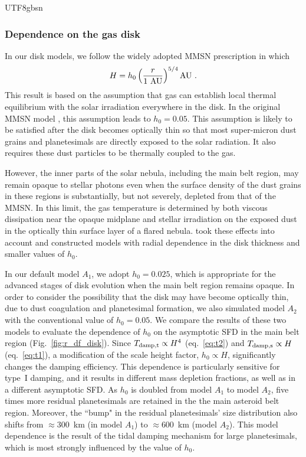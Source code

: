 \documentclass[tighten]{aastex6}
\begin{document}
\begin{CJK*}{UTF8}{gbsn}
\subsubsection{Dependence on the gas disk}
\label{sec:disk}

In our disk models, we follow the widely adopted MMSN prescription in which
\begin{equation}
H = h_0 \left(\frac{r}{1~\rm AU}\right)^{5/4}  \rm AU \ .
\end{equation}
%
This result is based on the assumption that gas can establish local 
thermal equilibrium with the solar irradiation everywhere in the disk. 
In the original MMSN model \citep{hayashi1981}, this assumption leads 
to $h_0 = 0.05$.  This assumption is likely to be satisfied after the 
disk becomes optically thin so that most super-micron dust grains and 
planetesimals are directly exposed to the solar radiation.  It also 
requires these dust particles to be thermally coupled to the gas.

However, the inner parts of the solar nebula, including the main belt 
region, may remain opaque to stellar photons even when the surface 
density of the dust grains in these regions is substantially, but 
not severely, depleted from that of the MMSN. In this limit, the gas 
temperature is determined by both viscous dissipation near the opaque 
midplane and stellar irradiation on the exposed dust in the optically 
thin surface layer of a flared nebula.  \cite{garaudlin2007} took 
these effects into account and constructed models with radial 
dependence in the disk thickness and smaller values of $h_0$. 

In our default model $A_1$, we adopt $h_0 = 0.025$, which is 
appropriate for the advanced stages of disk evolution when the main 
belt region remains opaque.  In order to consider the possibility
that the disk may have become optically thin, due to dust coagulation 
and planetesimal formation, we also simulated model $A_2$ with the 
conventional value of $h_0 = 0.05$.  We compare the results of these
two models to evaluate the dependence of $h_0$ on the asymptotic
SFD in the main belt region (Fig.~\ref{fig:r_df_disk}). Since 
$T_{\rm damp,t} \propto H^4$ (eq.~\ref{eq:t2}) and $T_{\rm damp,s} 
\propto H$ (eq.~\ref{eq:t1}), a modification of the scale height factor,
$h_0\propto H$, significantly changes the damping efficiency. 
This dependence is particularly sensitive for  type~I damping, 
and it results in different mass depletion fractions, as well as in a
different asymptotic SFD. As $h_0$ is doubled from model $A_1$ to model
$A_2$, five times more residual planetesimals are retained in the 
the main asteroid belt region. Moreover, the ``bump" in the residual
planetesimals' size distribution also shifts from $\approx 300$~km 
(in model $A_1$) to $\approx 600$~km (model $A_2$). This model dependence
is the result of the tidal damping mechanism for large planetesimals, 
which is most strongly influenced by the value of $h_0$.


\end{CJK*}
\end{document}
